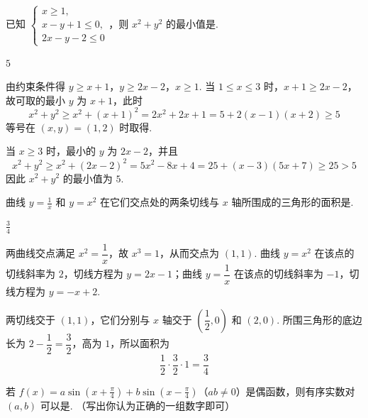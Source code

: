 \begin{problem}
已知 \(\begin{cases}
x \geqslant 1,\\
x - y + 1 \leqslant 0,\\
2x - y - 2 \leqslant 0
\end{cases}\)，则 \(x^2 + y^2\) 的最小值是\fillinblank{}.
\end{problem}

\begin{answer}
\(5\)
\end{answer}

\begin{solution}
由约束条件得
\(y\geqslant x+1\)，\(y\geqslant2x-2\)，\(x\geqslant1\).
当 \(1\leqslant x\leqslant3\) 时，\(x+1\geqslant2x-2\)，故可取的最小 \(y\) 为 \(x+1\)，此时
\[
x^2+y^2\geqslant x^2+(x+1)^2=2x^2+2x+1=5+2(x-1)(x+2)\geqslant5
\]
等号在 \((x,y)=(1,2)\) 时取得.

当 \(x\geqslant3\) 时，最小的 \(y\) 为 \(2x-2\)，并且
\[
x^2+y^2\geqslant x^2+(2x-2)^2=5x^2-8x+4=25+(x-3)(5x+7)\geqslant25>5
\]
因此 \(x^2+y^2\) 的最小值为 \(5\).
\end{solution}

\begin{problem}
曲线 \(y = \frac{1}{x}\) 和 \(y = x^2\) 在它们交点处的两条切线与 \(x\) 轴所围成的三角形的面积是\fillinblank{}.
\end{problem}

\begin{answer}
\(\frac{3}{4}\)
\end{answer}

\begin{solution}
两曲线交点满足 \(x^2=\dfrac1x\)，故 \(x^3=1\)，从而交点为 \((1,1)\). 曲线 \(y=x^2\) 在该点的切线斜率为 \(2\)，切线方程为 \(y=2x-1\)；曲线 \(y=\dfrac1x\) 在该点的切线斜率为 \(-1\)，切线方程为 \(y=-x+2\).

两切线交于 \((1,1)\)，它们分别与 \(x\) 轴交于 \(\left(\dfrac12,0\right)\) 和 \((2,0)\). 所围三角形的底边长为 \(2-\dfrac12=\dfrac32\)，高为 \(1\)，所以面积为
\[
\frac12\cdot\frac32\cdot1=\frac34
\]
\end{solution}

\begin{problem}
若 \( f(x) = a \sin \left( x + \frac{\pi}{4} \right) + b \sin \left( x - \frac{\pi}{4} \right) \)（\(ab \neq 0\)）是偶函数，则有序实数对 \((a, b)\) 可以是\fillinblank{}. （写出你认为正确的一组数字即可）
\end{problem}

